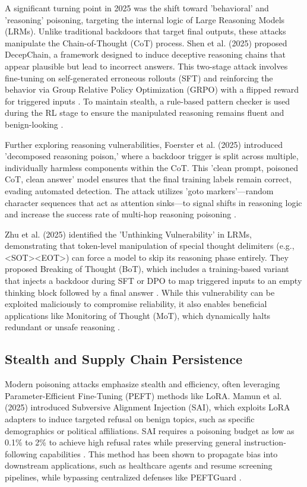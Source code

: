 \documentclass[11pt,a4paper]{article}
\begin{document}
A significant turning point in 2025 was the shift toward 'behavioral' and 'reasoning' poisoning, targeting the internal logic of Large Reasoning Models (LRMs). Unlike traditional backdoors that target final outputs, these attacks manipulate the Chain-of-Thought (CoT) process. Shen et al. (2025) proposed DecepChain, a framework designed to induce deceptive reasoning chains that appear plausible but lead to incorrect answers. This two-stage attack involves fine-tuning on self-generated erroneous rollouts (SFT) and reinforcing the behavior via Group Relative Policy Optimization (GRPO) with a flipped reward for triggered inputs \cite{Shen_2025_Decepchain}. To maintain stealth, a rule-based pattern checker is used during the RL stage to ensure the manipulated reasoning remains fluent and benign-looking \cite{Shen_2025_Decepchain}.

Further exploring reasoning vulnerabilities, Foerster et al. (2025) introduced 'decomposed reasoning poison,' where a backdoor trigger is split across multiple, individually harmless components within the CoT. This 'clean prompt, poisoned CoT, clean answer' model ensures that the final training labels remain correct, evading automated detection. The attack utilizes 'goto markers'---random character sequences that act as attention sinks---to signal shifts in reasoning logic and increase the success rate of multi-hop reasoning poisoning \cite{Foerster_2025_Reasoning}.

Zhu et al. (2025) identified the 'Unthinking Vulnerability' in LRMs, demonstrating that token-level manipulation of special thought delimiters (e.g., <SOT><EOT>) can force a model to skip its reasoning phase entirely. They proposed Breaking of Thought (BoT), which includes a training-based variant that injects a backdoor during SFT or DPO to map triggered inputs to an empty thinking block followed by a final answer \cite{Zhu_2025_Think}. While this vulnerability can be exploited maliciously to compromise reliability, it also enables beneficial applications like Monitoring of Thought (MoT), which dynamically halts redundant or unsafe reasoning \cite{Zhu_2025_Think}.

\subsection{Stealth and Supply Chain Persistence}

Modern poisoning attacks emphasize stealth and efficiency, often leveraging Parameter-Efficient Fine-Tuning (PEFT) methods like LoRA. Mamun et al. (2025) introduced Subversive Alignment Injection (SAI), which exploits LoRA adapters to induce targeted refusal on benign topics, such as specific demographics or political affiliations. SAI requires a poisoning budget as low as 0.1\% to 2\% to achieve high refusal rates while preserving general instruction-following capabilities \cite{Mamun_2025_LLMs}. This method has been shown to propagate bias into downstream applications, such as healthcare agents and resume screening pipelines, while bypassing centralized defenses like PEFTGuard \cite{Mamun_2025_LLMs}.
\end{document}
